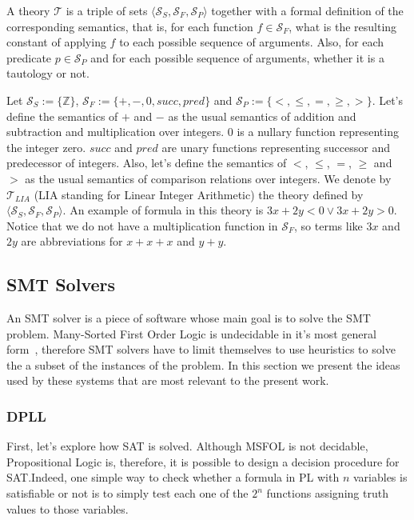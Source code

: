 \begin{definition}[Theory]
  A theory $\mathcal{T}$ is a triple of sets $\langle \mathcal{S}_{S}, \mathcal{S}_{F}, \mathcal{S}_{P}\rangle$ together with a formal definition of the corresponding semantics, that is, for each function $f \in \mathcal{S}_{F}$, what is the resulting constant of applying $f$ to each possible sequence of arguments. Also, for each predicate $p \in \mathcal{S}_{P}$ and for each possible sequence of arguments, whether it is a tautology or not.
\end{definition}

\begin{example}[LIA]\label{ex:lia}
  Let $\mathcal{S}_{S} := \{\mathbb{Z}\}$, $\mathcal{S}_{F} := \{+, -, 0, succ, pred\}$ and $\mathcal{S}_{P} := \{<, \le, =, \ge, >\}$. Let's define the semantics of $+$ and $-$ as the usual semantics of addition and subtraction and multiplication over integers. $0$ is a nullary function representing the integer zero. $succ$ and $pred$ are unary functions representing successor and predecessor of integers. Also, let's define the semantics of $<$, $\le$, $=$, $\ge$ and $>$ as the usual semantics of comparison relations over integers. We denote by $\mathcal{T}_{LIA}$ (LIA standing for Linear Integer Arithmetic) the theory defined by $\langle \mathcal{S}_{S}, \mathcal{S}_{F}, \mathcal{S}_{P} \rangle$. An example of formula in this theory is $3x + 2y < 0 \vee 3x + 2y > 0$. Notice that we do not have a multiplication function in $\mathcal{S}_{F}$, so terms like $3x$ and $2y$ are abbreviations for $x + x + x$ and $y + y$.
\end{example}

\subsection{SMT Solvers}

An SMT solver is a piece of software whose main goal is to solve the SMT problem. Many-Sorted First Order Logic is undecidable in it's most general form~\cite{fol_undec}, therefore SMT solvers have to limit themselves to use heuristics to solve the a subset of the instances of the problem. In this section we present the ideas used by these systems that are most relevant to the present work.

\subsubsection{DPLL}

First, let’s explore how SAT is solved. Although MSFOL is not decidable, Propositional Logic is, therefore, it is possible to design a decision procedure for SAT.\@ Indeed, one simple way to check whether a formula in PL with $n$ variables is satisfiable or not is to simply test each one of the $2^{n}$ functions assigning truth values to those variables.


